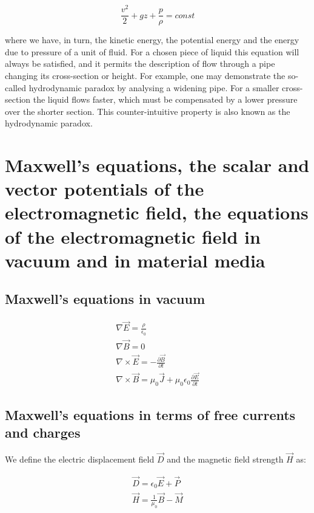 \[
\frac{v^2}{2} + gz + \frac{p}{\rho} = const
\]

where we have, in turn, the kinetic energy, the potential energy and the energy due to pressure of a unit of fluid. For a chosen piece of liquid this equation will always be satisfied, and it permits the description of flow through a pipe changing its cross-section or height. For example, one may demonstrate the so-called hydrodynamic paradox by analysing a widening pipe. For a smaller cross-section the liquid flows faster, which must be compensated by a lower pressure over the shorter section. This counter-intuitive property is also known as the hydrodynamic paradox.\merr

\section{Maxwell's equations, the scalar and vector potentials of the electromagnetic field, the equations of the electromagnetic field in vacuum and in material media}

\subsection{Maxwell's equations in vacuum}

\begin{equation}
    \begin{matrix}
    \nabla \vec{E} = \frac{\rho}{\epsilon_{0}}\\
    \nabla \vec{B} = 0\\
    \nabla\times\vec{E} = -\frac{\partial \vec{B}}{\partial t}\\
    \nabla\times\vec{B} = \mu_{0}\vec{J} + \mu_{0}\epsilon_{0}\frac{\partial\vec{E}}{\partial t}
    \end{matrix}
\end{equation}

\subsection{Maxwell's equations in terms of free currents and charges}

We define the electric displacement field $\vec{D}$ and the magnetic field strength $\vec{H}$ as:

\begin{equation}
    \begin{matrix}
        \vec{D} = \epsilon_{0}\vec{E} + \vec{P}\\
        \vec{H} = \frac{1}{\mu_{0}}\vec{B} - \vec{M}
    \end{matrix}
\end{equation}

